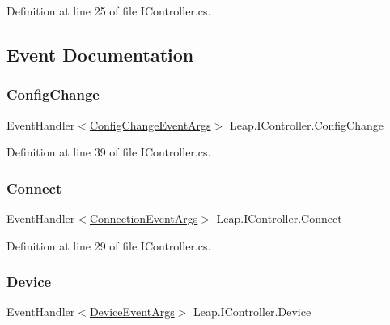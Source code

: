 Definition at line 25 of file I\+Controller.\+cs.



\subsection{Event Documentation}
\mbox{\label{interface_leap_1_1_i_controller_a1a058aa83e4702e93195523f67b6b688}} 
\subsubsection{\texorpdfstring{ConfigChange}{ConfigChange}}
{\footnotesize\ttfamily Event\+Handler$<$\mbox{\hyperlink{class_leap_1_1_config_change_event_args}{Config\+Change\+Event\+Args}}$>$ Leap.\+I\+Controller.\+Config\+Change}



Definition at line 39 of file I\+Controller.\+cs.

\mbox{\label{interface_leap_1_1_i_controller_a501a0d790157763790a9088e295d889e}} 
\subsubsection{\texorpdfstring{Connect}{Connect}}
{\footnotesize\ttfamily Event\+Handler$<$\mbox{\hyperlink{class_leap_1_1_connection_event_args}{Connection\+Event\+Args}}$>$ Leap.\+I\+Controller.\+Connect}



Definition at line 29 of file I\+Controller.\+cs.

\mbox{\label{interface_leap_1_1_i_controller_a06a0872cb73a447a2a278ade153445cc}} 
\subsubsection{\texorpdfstring{Device}{Device}}
{\footnotesize\ttfamily Event\+Handler$<$\mbox{\hyperlink{class_leap_1_1_device_event_args}{Device\+Event\+Args}}$>$ Leap.\+I\+Controller.\+Device}



